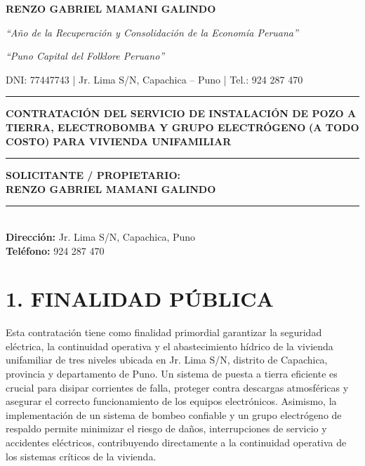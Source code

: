 \documentclass[12pt,a4paper]{article}
\begin{document}
\begin{center}
\vspace*{-1.5cm}
{\large\textbf{RENZO GABRIEL MAMANI GALINDO}}

\vspace{0.1cm}
{\small\textit{``Año de la Recuperación y Consolidación de la Economía Peruana''}}

\vspace{0.1cm}
{\small\textit{``Puno Capital del Folklore Peruano''}}

\vspace{0.1cm}
{\small DNI: 77447743 \quad | \quad Jr. Lima S/N, Capachica -- Puno \quad | \quad Tel.: 924 287 470}

\vspace{0.5cm}
\rule{\textwidth}{1pt}
\vspace{0.3cm}

{\Large\textbf{CONTRATACIÓN DEL SERVICIO DE INSTALACIÓN DE POZO A TIERRA,
ELECTROBOMBA Y GRUPO ELECTRÓGENO}}
{\Large\textbf{(A TODO COSTO) PARA VIVIENDA UNIFAMILIAR}}

\vspace{0.3cm}
\rule{\textwidth}{1pt}

\vspace{0.5cm}
\begin{flushleft}
\large
\textbf{SOLICITANTE / PROPIETARIO:} \\
{\LARGE\bfseries\color{navyblue} RENZO GABRIEL MAMANI GALINDO} \\
\rule{0.4\textwidth}{2pt} \\
\medskip
\large
\textbf{Dirección:} Jr. Lima S/N, Capachica, Puno \\
\textbf{Teléfono:} 924 287 470
\end{flushleft}
\end{center}

\section*{1. FINALIDAD PÚBLICA}

Esta contratación tiene como finalidad primordial garantizar la seguridad eléctrica, la continuidad operativa y el abastecimiento hídrico de la vivienda unifamiliar de tres niveles ubicada en Jr. Lima S/N, distrito de Capachica, provincia y departamento de Puno. Un sistema de puesta a tierra eficiente es crucial para disipar corrientes de falla, proteger contra descargas atmosféricas y asegurar el correcto funcionamiento de los equipos electrónicos. Asimismo, la implementación de un sistema de bombeo confiable y un grupo electrógeno de respaldo permite minimizar el riesgo de daños, interrupciones de servicio y accidentes eléctricos, contribuyendo directamente a la continuidad operativa de los sistemas críticos de la vivienda.
\end{document}
